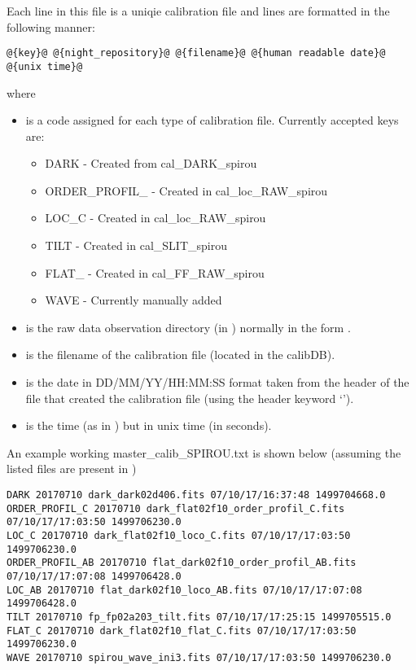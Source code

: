 Each line in this file is a uniqie calibration file and lines are formatted in the following manner:
\begin{lstlisting}[style=text]
@{key}@ @{night_repository}@ @{filename}@ @{human readable date}@ @{unix time}@ 
\end{lstlisting}

\noindent where
\begin{itemize}
\item {} is a code assigned for each type of calibration file. Currently accepted keys are:
\begin{itemize}
\item DARK - Created from cal\_DARK\_spirou
\item ORDER\_PROFIL\_ - Created in cal\_loc\_RAW\_spirou
\item LOC\_C - Created in cal\_loc\_RAW\_spirou
\item TILT - Created in cal\_SLIT\_spirou
\item FLAT\_ - Created in cal\_FF\_RAW\_spirou
\item WAVE - Currently manually added
\end{itemize}

\item {} is the raw data observation directory (in ) normally in the form \constantFolderDateFormat.

\item {} is the filename of the calibration file (located in the calibDB).

\item {} is the date in DD/MM/YY/HH:MM:SS format taken from the header of the file that created the calibration file (using the header keyword `\constantAcqtimeKey').

\item {} is the time (as in ) but in unix time (in seconds).

\end{itemize}

\noindent An example working master\_calib\_SPIROU.txt is shown below (assuming the listed files are present in )
\begin{lstlisting}[style=text]
DARK 20170710 dark_dark02d406.fits 07/10/17/16:37:48 1499704668.0
ORDER_PROFIL_C 20170710 dark_flat02f10_order_profil_C.fits 07/10/17/17:03:50 1499706230.0
LOC_C 20170710 dark_flat02f10_loco_C.fits 07/10/17/17:03:50 1499706230.0
ORDER_PROFIL_AB 20170710 flat_dark02f10_order_profil_AB.fits 07/10/17/17:07:08 1499706428.0
LOC_AB 20170710 flat_dark02f10_loco_AB.fits 07/10/17/17:07:08 1499706428.0
TILT 20170710 fp_fp02a203_tilt.fits 07/10/17/17:25:15 1499705515.0
FLAT_C 20170710 dark_flat02f10_flat_C.fits 07/10/17/17:03:50 1499706230.0
WAVE 20170710 spirou_wave_ini3.fits 07/10/17/17:03:50 1499706230.0
\end{lstlisting}

